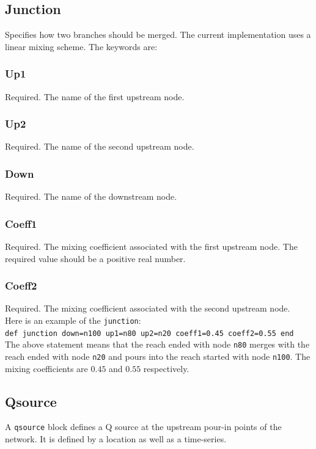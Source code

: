 \documentclass[10pt, letterpaper]{article}
\begin{document}
\subsection{Junction}
\label{subsec:junction}
Specifies how two branches should be merged. The current implementation uses a linear
mixing scheme. The keywords are:

\subsubsection{Up1}
\label{subsubsec:up1}
Required. The name of the first upstream node.

\subsubsection{Up2}
\label{subsubsec:up2}
Required. The name of the second upstream node.

\subsubsection{Down}
\label{subsubsec:downn}
Required. The name of the downstream node.

\subsubsection{Coeff1}
\label{subsubsec:coeff1}
Required. The mixing coefficient associated with the first upstream node. The required
value should be a positive real number.

\subsubsection{Coeff2}
\label{subsubsec:coeff2}
Required. The mixing coefficient associated with the second upstream node. 
\\
Here is an example of the {\tt junction}:\\
{\tt def junction down=n100 up1=n80 up2=n20 coeff1=0.45 coeff2=0.55 end}\\
The above statement means that the reach ended with node {\tt n80} merges with the reach
ended with node {\tt n20} and pours into the reach started with node {\tt n100}. The mixing
coefficients are $0.45$ and $0.55$ respectively.


\subsection{Qsource}
\label{subsec:qsources}
A {\tt qsource} block defines a Q source at the upstream pour-in points of the
network. It is defined by a location as well as a time-series.
\end{document}
